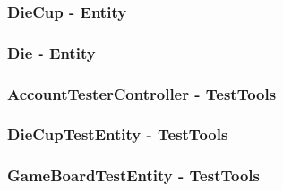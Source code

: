 \documentclass{article}
\begin{document}
\subsubsection{DieCup - Entity}

\subsubsection{Die - Entity}

\subsubsection{AccountTesterController - TestTools}

\subsubsection{DieCupTestEntity - TestTools}

\subsubsection{GameBoardTestEntity - TestTools}

\end{document}
